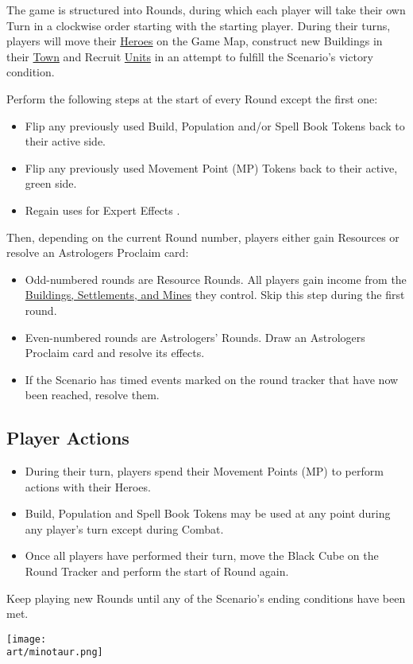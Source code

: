 
\begin{multicols*}{2}

The game is structured into Rounds, during which each player will take their own Turn in a clockwise order starting with the starting player.
During their turns, players will move their \hyperlink{Heroes}{Heroes} on the Game Map, construct new Buildings in their \hyperlink{Town}{Town} and Recruit \hyperlink{Units}{Units} in an attempt to fulfill the Scenario's victory condition.\par
Perform the following steps at the start of every Round except the first one:
\begin{itemize}
  \item Flip any previously used Build, Population and/or Spell Book Tokens back to their active side.
  \item Flip any previously used Movement Point (MP) Tokens back to their active, green side.
  \item Regain uses for Expert Effects .
\end{itemize}
Then, depending on the current Round number, players either gain Resources or resolve an Astrologers Proclaim card:
\begin{itemize}
  \item Odd-numbered rounds are Resource Rounds.
    All players gain income from the \hyperlink{Mines}{Buildings, Settlements, and Mines} they control.
    Skip this step during the first round.
  \item Even-numbered rounds are Astrologers' Rounds.
    Draw an Astrologers Proclaim card and resolve its effects.
  \item If the Scenario has timed events marked on the round tracker that have now been reached, resolve them.
\end{itemize}
\subsection*{Player Actions}
\begin{itemize}
  \item During their turn, players spend their Movement Points (MP) to perform actions with their Heroes.
  \item Build, Population and Spell Book Tokens may be used at any point during any player's turn except during Combat.
  \item Once all players have performed their turn, move the Black Cube on the Round Tracker and perform the start of Round again.
\end{itemize}
Keep playing new Rounds until any of the Scenario's ending conditions have been met.

\vfill
\hspace{2em}
\texttt{[image: \\art/minotaur.png]}
\vfill

\end{multicols*}
